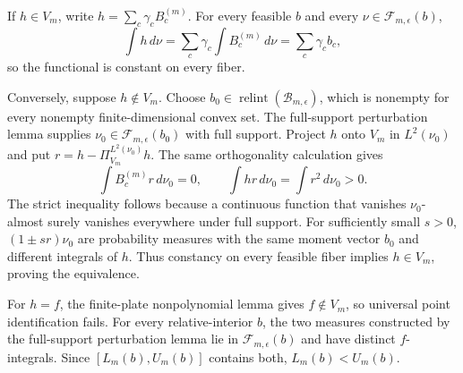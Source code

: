 If \(h\in V_m\), write \(h=\sum_c\gamma_cB_c^{(m)}\).  For every feasible \(b\) and every \(\nu\in\mathcal F_{m,\epsilon}(b)\),
\[
 \int h\,d\nu=\sum_c\gamma_c\int B_c^{(m)}\,d\nu
 =\sum_c\gamma_cb_c,
\]
so the functional is constant on every fiber.

Conversely, suppose \(h\notin V_m\).  Choose \(b_0\in\operatorname{relint}(\mathcal B_{m,\epsilon})\), which is nonempty for every nonempty finite-dimensional convex set.  The full-support perturbation lemma supplies \(\nu_0\in\mathcal F_{m,\epsilon}(b_0)\) with full support.  Project \(h\) onto \(V_m\) in \(L^2(\nu_0)\) and put \(r=h-\Pi_{V_m}^{L^2(\nu_0)}h\).  The same orthogonality calculation gives
\[
 \int B_c^{(m)}r\,d\nu_0=0,
 \qquad
 \int hr\,d\nu_0=\int r^2\,d\nu_0>0.
\]
The strict inequality follows because a continuous function that vanishes \(\nu_0\)-almost surely vanishes everywhere under full support.  For sufficiently small \(s>0\), \((1\pm sr)\nu_0\) are probability measures with the same moment vector \(b_0\) and different integrals of \(h\).  Thus constancy on every feasible fiber implies \(h\in V_m\), proving the equivalence.

For \(h=f\), the finite-plate nonpolynomial lemma gives \(f\notin V_m\), so universal point identification fails.  For every relative-interior \(b\), the two measures constructed by the full-support perturbation lemma lie in \(\mathcal F_{m,\epsilon}(b)\) and have distinct \(f\)-integrals.  Since \([L_m(b),U_m(b)]\) contains both, \(L_m(b)<U_m(b)\).